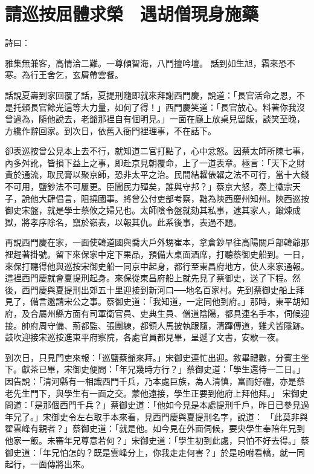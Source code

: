 %

\chapter{請巡按屈體求榮　遇胡僧現身施藥}


\begin{showcontents}{}


詩曰：

雅集無兼客，高情洽二難。一尊傾智海，八鬥擅吟壇。
話到如生旭，霜來恐不寒。為行王舍乞，玄屑帶雲餐。

話說夏壽到家回覆了話，夏提刑隨即就來拜謝西門慶，說道：「長官活命之恩，不是托賴長官餘光這等大力量，如何了得！」西門慶笑道：「長官放心。料著你我沒曾過為，隨他說去，老爺那裡自有個明見。」一面在廳上放桌兒留飯，談笑至晚，方纔作辭回家。到次日，依舊入衙門裡理事，不在話下。

卻表巡按曾公見本上去不行，就知道二官打點了，心中忿怒。因蔡太師所陳七事，內多舛訛，皆損下益上之事，即赴京見朝覆命，上了一道表章。極言：「天下之財貴於通流，取民膏以聚京師，恐非太平之治。民間結糶俵糴之法不可行，當十大錢不可用，鹽鈔法不可屢更。臣聞民力殫矣，誰與守邦？」蔡京大怒，奏上徽宗天子，說他大肆倡言，阻撓國事。將曾公付吏部考察，黜為陝西慶州知州。陝西巡按御史宋盤，就是學士蔡攸之婦兄也。太師陰令盤就劾其私事，逮其家人，鍛煉成獄，將孝序除名，竄於嶺表，以報其仇。此系後事，表過不題。

再說西門慶在家，一面使韓道國與喬大戶外甥崔本，拿倉鈔早往高陽關戶部韓爺那裡趕著掛號。留下來保家中定下果品，預備大桌面酒席，打聽蔡御史船到。一日，來保打聽得他與巡按宋御史船一同京中起身，都行至東昌府地方，使人來家通報。這裡西門慶就會夏提刑起身。來保從東昌府船上就先見了蔡御史，送了下程。然後，西門慶與夏提刑出郊五十里迎接到新河口──地名百家村。先到蔡御史船上拜見了，備言邀請宋公之事。蔡御史道：「我知道，一定同他到府。」那時，東平胡知府，及合屬州縣方面有司軍衛官員、吏典生員、僧道陰陽，都具連名手本，伺候迎接。帥府周守備、荊都監、張團練，都領人馬披執跟隨，清蹕傳道，雞犬皆隱跡。鼓吹迎接宋巡按進東平府察院，各處官員都見畢，呈遞了文書，安歇一夜。

到次日，只見門吏來報：「巡鹽蔡爺來拜。」宋御史連忙出迎。敘畢禮數，分賓主坐下。獻茶已畢，宋御史便問：「年兄幾時方行？」蔡御史道：「學生還待一二日。」因告說：「清河縣有一相識西門千兵，乃本處巨族，為人清慎，富而好禮，亦是蔡老先生門下，與學生有一面之交。蒙他遠接，學生正要到他府上拜他拜。」 宋御史問道：「是那個西門千兵？」蔡御史道：「他如今見是本處提刑千戶，昨日已參見過年兄了。」宋御史令左右取手本來看，見西門慶與夏提刑名字，說道： 「此莫非與翟雲峰有親者？」蔡御史道：「就是他。如今見在外面伺候，要央學生奉陪年兄到他家一飯。未審年兄尊意若何？」宋御史道：「學生初到此處，只怕不好去得。」蔡御史道：「年兄怕怎的？既是雲峰分上，你我走走何害？」於是吩咐看轎，就一同起行，一面傳將出來。


\end{showcontents}
